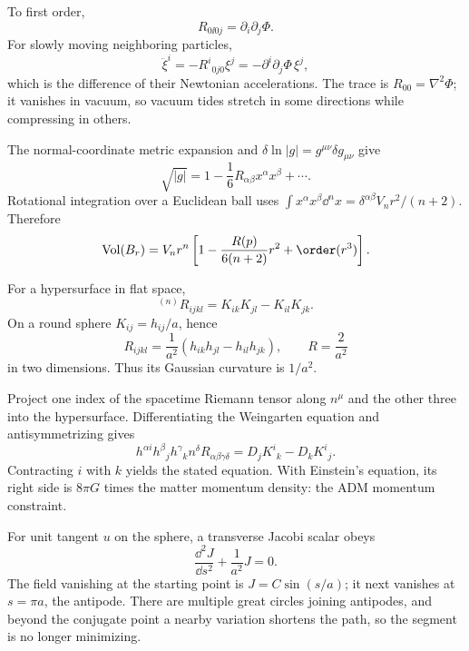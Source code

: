 \begin{solution}
To first order,
\[
R_{0\ii0j}=\partial_i\partial_j\Phi.
\]
For slowly moving neighboring particles,
\[
\ddot\xi^i=-R^i{}_{0j0}\xi^j
=-\partial^i\partial_j\Phi\,\xi^j,
\]
which is the difference of their Newtonian accelerations.  The trace is
\(R_{00}=\nabla^2\Phi\); it vanishes in vacuum, so vacuum tides stretch in some
directions while compressing in others.
\end{solution}

\begin{solution}
The normal-coordinate metric expansion and
\(\delta\ln|g|=g^{\mu\nu}\delta g_{\mu\nu}\) give
\[
\sqrt{|g|}=1-\frac16R_{\alpha\beta}x^\alpha x^\beta+\cdots.
\]
Rotational integration over a Euclidean ball uses
\(\int x^\alpha x^\beta\dd^nx
=\delta^{\alpha\beta}V_n r^2/(n+2)\).  Therefore
\[
\operatorname{Vol}(B_r)
=V_n r^n\left[1-\frac{R(p)}{6(n+2)}r^2+\order(r^3)\right].
\]
\end{solution}

\begin{solution}
For a hypersurface in flat space,
\[
{}^{(n)}R_{ijkl}=K_{ik}K_{jl}-K_{il}K_{jk}.
\]
On a round sphere \(K_{ij}=h_{ij}/a\), hence
\[
R_{ijkl}=\frac1{a^2}(h_{ik}h_{jl}-h_{il}h_{jk}),\qquad
R=\frac{2}{a^2}
\]
in two dimensions.  Thus its Gaussian curvature is \(1/a^2\).
\end{solution}

\begin{solution}
Project one index of the spacetime Riemann tensor along \(n^\mu\) and the
other three into the hypersurface.  Differentiating the Weingarten equation
and antisymmetrizing gives
\[
h^{\alpha i}h^\beta{}_j h^\gamma{}_k n^\delta
R_{\alpha\beta\gamma\delta}
=D_jK^i{}_k-D_kK^i{}_j.
\]
Contracting \(i\) with \(k\) yields the stated equation.  With Einstein's
equation, its right side is \(8\pi G\) times the matter momentum density: the
ADM momentum constraint.
\end{solution}

\begin{solution}
For unit tangent \(u\) on the sphere, a transverse Jacobi scalar obeys
\[
\frac{\dd^2J}{\dd s^2}+\frac1{a^2}J=0.
\]
The field vanishing at the starting point is
\(J=C\sin(s/a)\); it next vanishes at \(s=\pi a\), the antipode.  There are
multiple great circles joining antipodes, and beyond the conjugate point a
nearby variation shortens the path, so the segment is no longer minimizing.
\end{solution}

